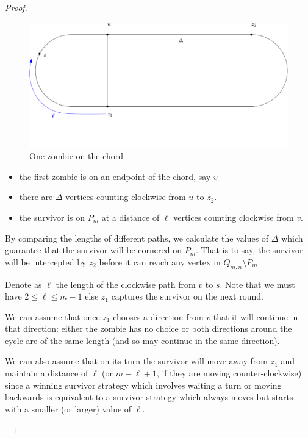 \begin{proof}
\begin{description}
  \begin{figure}
    \centering
    \includegraphics[scale=0.20]{q_m_n/diagram1}
    \caption{One zombie on the chord \label{fig:onthechord}}
  \end{figure}

  \begin{itemize}
   \item the first zombie is on an endpoint of the chord, say $v$
   \item there are $\Delta$ vertices counting clockwise from $u$ to $z_2$.
   \item the survivor is on $P_m$ at a distance of $\ell$ vertices counting
   clockwise from $v$.
  \end{itemize}

  By comparing the lengths of different paths, we calculate the values of $\Delta$
  which guarantee that the survivor will be cornered on $P_m$. That is to say,
  the survivor will be intercepted by $z_2$ before it can reach any vertex
  in $Q_{m,n} \setminus P_m$.

  Denote as $\ell$ the length of the clockwise
  path from $v$ to $s$. Note that we must have $2 \leq \ell \leq m-1$ else
  $z_1$ captures the survivor on the next round.

  We can assume that once $z_1$ chooses a direction from $v$
  that it will continue in that direction:
  either the zombie has no choice or both directions around
  the cycle are of the same length (and so
  may continue in the same direction).

  We can also assume that on its turn the survivor will move away from
  $z_1$ and maintain a distance of $\ell$ (or $m-\ell +1$, if they are moving counter-clockwise)
  since a winning survivor strategy which involves waiting a turn
  or moving backwards is equivalent to a survivor strategy
  which always moves but starts with a smaller (or larger) value of $\ell$.


\end{description}
\end{proof}
